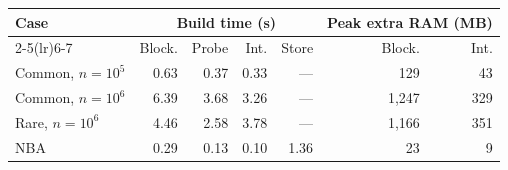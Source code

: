 \begin{tabular}{lrrrrrr}
\toprule
Case & \multicolumn{4}{c}{Build time (s)} & \multicolumn{2}{c}{Peak extra RAM (MB)}\\
\cmidrule(lr){2-5}\cmidrule(lr){6-7}
 & Block. & Probe & Int. & Store & Block. & Int.\\
\midrule
Common, $n=10^5$ & 0.63 & 0.37 & 0.33 & --- & 129 & 43\\
Common, $n=10^6$ & 6.39 & 3.68 & 3.26 & --- & 1{,}247 & 329\\
Rare, $n=10^6$ & 4.46 & 2.58 & 3.78 & --- & 1{,}166 & 351\\
NBA & 0.29 & 0.13 & 0.10 & 1.36 & 23 & 9\\
\bottomrule
\end{tabular}
